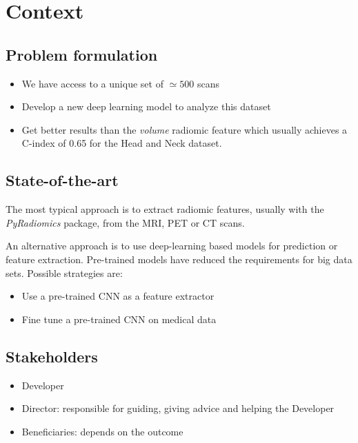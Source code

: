 \section{Context}
\subsection{Problem formulation}
\begin{frame}{\insertsubsec}
  \begin{itemize}
    \item We have access to a unique set of \( \simeq 500 \) scans
    \item Develop a new deep learning model to analyze this dataset
    \item Get better results than the \emph{volume} radiomic feature which usually achieves
    a C-index of 0.65 for the Head and Neck dataset. 
  \end{itemize}
\end{frame}

\subsection{State-of-the-art}
\begin{frame}{\insertsubsec}
  The most typical approach is to extract radiomic features, usually with
  the \emph{PyRadiomics} package, from the MRI, PET or CT scans.

  \vspace{.5cm}
  An alternative approach is to use deep-learning based models for prediction or 
  feature extraction. Pre-trained models have reduced the requirements for big data sets.
  Possible strategies are:
  \begin{itemize}
    \item Use a pre-trained CNN as a feature extractor
    \item Fine tune a pre-trained CNN on medical data
  \end{itemize}
  
\end{frame}

\subsection{Stakeholders}
\begin{frame}{\insertsubsec}
  \begin{itemize}
    \item Developer
    \item Director: responsible for guiding, giving advice and helping the Developer
    \item Beneficiaries: depends on the outcome
  \end{itemize}
\end{frame}

